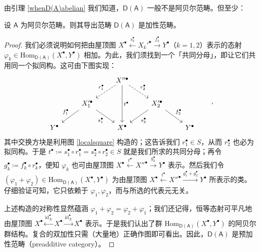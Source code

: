 由引理 \ref{whenD(A)abelian} 我们知道，$\mathsf{D(A)}$ 一般不是阿贝尔范畴。但至少：

\begin{Lem}\label{D(A)additive}
	设 $\mathsf{A}$ 为阿贝尔范畴。则其导出范畴 $\mathsf{D(A)}$ 是加性范畴。
\end{Lem}

\begin{proof}
	我们必须说明如何把由屋顶图 $X^\bullet\xleftarrow{s_k^\bullet}X_k'^\bullet\xrightarrow{f_k^\bullet}Y^\bullet$（$k=1,2$）表示的态射 $\varphi_k\in\text{Hom}_\mathsf{D(A)}(X^\bullet,Y^\bullet)$ 相加。为此，我们须找到一个「共同分母」，即让它们共用同一个拟同构。这可由下图实现：
	\begin{equation}
		\begin{tikzcd}
			& & X''^\bullet\arrow[dl, dashed, "r_1^\bullet"']\arrow[dr, dashed, "r_2^\bullet"]\arrow[dd, "t^\bullet"] & & \\
			& X_1'^\bullet\arrow[dl, "f_1^\bullet"']\arrow[dr, "s_1^\bullet"'] & & X_2'^\bullet\arrow[dl, "s_2^\bullet"]\arrow[dr, "f_2^\bullet"] & \\
			Y^\bullet & & X^\bullet & & Y^\bullet 
		\end{tikzcd}\qquad,
	\end{equation}
	其中交换方块是利用图 \eqref{localsquare} 构造的；这告诉我们 $r_1^\bullet\in S$，从而 $r_2^\bullet$ 也必为拟同构。于是 $t^\bullet\coloneqq s_1^\bullet\circ r_1^\bullet= s_2^\bullet\circ r_2^\bullet\in S$ 就是我们所求的共同分母；再令 $g_k^\bullet\coloneqq f_k^\bullet\circ r_k^\bullet$，便知 $\varphi_k$ 也可由屋顶图 $X^\bullet\xleftarrow{t^\bullet}X''^\bullet\xrightarrow{g_k^\bullet}Y^\bullet$ 表示。然后我们令 $(\varphi_1+\varphi_2)\in\text{Hom}_\mathsf{D(A)}(X^\bullet,Y^\bullet)$ 为由屋顶图 $X^\bullet\xleftarrow{t^\bullet}X''^\bullet\xrightarrow{g_1^\bullet+g_2^\bullet}Y^\bullet$ 所表示的类。仔细验证可知，它只依赖于 $\varphi_1,\varphi_2$，而与所选的代表元无关。
	
	上述构造的对称性显然蕴涵 $\varphi_1+\varphi_2=\varphi_2+\varphi_1$；我们还记得，恒等态射可平凡地由屋顶图 $X^\bullet\xleftarrow{\text{id}_X^\bullet}X^\bullet\xrightarrow{\text{id}_X^\bullet}X^\bullet$ 表示。于是我们认出了群 $\text{Hom}_\mathsf{D(A)}(X^\bullet,Y^\bullet)$ 的阿贝尔群结构。复合的双加性只需（大量地）正确作图即可看出。因此，$\mathsf{D(A)}$ 是预加性范畴（preadditive category）。
	

\end{proof}

